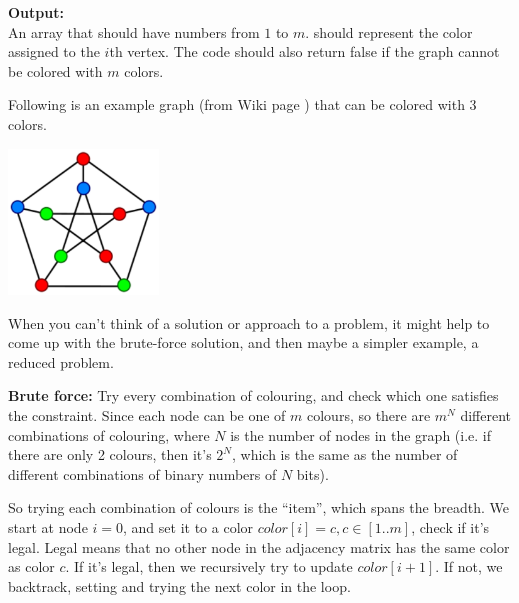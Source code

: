\noindent{}\textbf{Output:}\\
An array  that should have numbers from $1$ to $m$.
 should represent the color assigned to the $i$th vertex. The
code should also return false if the graph cannot be colored with $m$
colors.

Following is an example graph (from Wiki page ) that can be colored with 3
colors.

\includegraphics[width=0.3\textwidth]{Images/figGFGBkTSet5GraphColor}

\textbf{}

\RayNotesBegin

When you can't think of a solution or approach to a problem, it might help
to come up with the brute-force solution, and then maybe a simpler example,
a reduced problem.

\noindent{}\textbf{Brute force:} Try every combination of colouring, and
check which one satisfies the constraint. Since each node can be one of $m$
colours, so there are $m^N$ different combinations of colouring, where $N$
is the number of nodes in the graph (i.e. if there are only 2 colours, then
it's $2^N$, which is the same as the number of different combinations of
binary numbers of $N$ bits).

So trying each combination of colours is the ``item'', which spans the
breadth. We start at node $i=0$, and set it to a color $color[i]=c, c\in
[1..m]$, check if it's legal. Legal means that no other node in the
adjacency matrix has the same color as color $c$. If it's legal, then we
recursively try to update $color[i+1]$. If not, we backtrack, setting
 and trying the next color in the loop.


